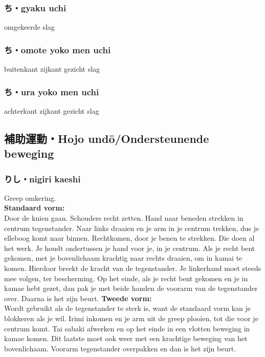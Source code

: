 \subsubsection{ち・gyaku uchi}
omgekeerde slag

\subsubsection{ち・omote yoko men uchi}
buitenkant zijkant gezicht slag

\subsubsection{ち・ura yoko men uchi}
achterkant zijkant gezicht slag

\subsection{補助運動・Hojo und\={o}/Ondersteunende beweging}
\subsubsection{りし・nigiri kaeshi}
Greep omkering.\\
\noindent \textbf{Standaard vorm:}\\
\noindent Door de knien gaan. Schouders recht zetten. Hand naar beneden strekken in centrum tegenstander. Naar links draaien en je arm in je centrum trekken, dus je elleboog komt naar binnen. Rechtkomen, door je benen te strekken. Die doen al het werk. Je houdt ondertussen je hand voor je, in je centrum. Als je recht bent gekomen, met je bovenlichaam krachtig naar rechts draaien, om in  kamai te komen. Hierdoor breekt de kracht van de tegenstander. Je linkerhand moet steeds mee volgen, ter bescherming. Op het einde, als je recht bent gekomen en je in kamae hebt gezet, dan pak je met beide handen de voorarm van de tegenstander over. Daarna is het zijn beurt.
\textbf{Tweede vorm:}\\
\noindent Wordt gebruikt als de tegenstander te sterk is, want de standaard vorm kan je blokkeren als je wil. Irimi inkomen en je arm uit de greep plooien, tot die voor je centrum komt. Tai sabaki afwerken en op het einde in een vlotten beweging in kamae komen. Dit laatste moet ook weer met een krachtige beweging van het bovenlichaam. Voorarm tegenstander overpakken en dan is het zijn beurt.

